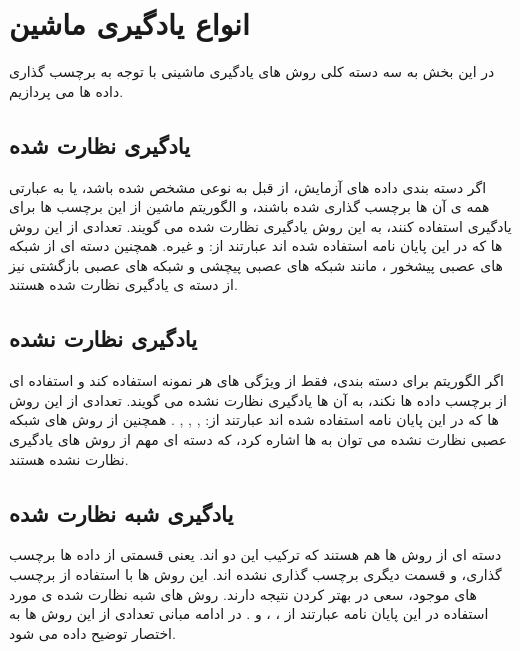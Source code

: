 \section{انواع یادگیری ماشین}

در این بخش به سه دسته کلی روش های یادگیری ماشینی با توجه به برچسب گذاری داده ها می پردازیم.

\subsection{یادگیری نظارت شده}
اگر دسته بندی داده های آزمایش، از قبل به نوعی مشخص شده باشد، یا به عبارتی همه ی آن ها برچسب گذاری شده باشند، و الگوریتم ماشین از این برچسب ها برای یادگیری استفاده کنند، به این روش یادگیری نظارت شده می گویند. تعدادی از این روش ها که در این پایان نامه استفاده شده اند عبارتند از:
و غیره. همچنین دسته ای از شبکه های عصبی پیشخور
،
مانند شبکه های عصبی پیچشی
و
شبکه های عصبی بازگشتی
نیز از دسته ی یادگیری نظارت شده هستند.

\subsection{یادگیری نظارت نشده}
اگر الگوریتم برای دسته بندی، فقط از ویژگی های هر نمونه استفاده کند و استفاده ای از برچسب داده ها نکند، به آن ها یادگیری نظارت نشده می گویند. تعدادی از این روش ها که در این پایان نامه استفاده شده اند عبارتند از:
,
,
,
.
همچنین از روش های شبکه عصبی نظارت نشده می توان به
ها اشاره کرد، که دسته ای مهم از روش های یادگیری نظارت نشده هستند.

\subsection{یادگیری شبه نظارت شده}
دسته ای از روش ها هم هستند که ترکیب این دو اند. یعنی قسمتی از داده ها برچسب گذاری، ‌و قسمت دیگری برچسب گذاری نشده اند.
این روش ها با استفاده از برچسب های موجود، سعی در بهتر کردن نتیجه دارند. روش های شبه نظارت شده ی مورد استفاده در این پایان نامه عبارتند از
،
،
و
.
در ادامه مبانی تعدادی از این روش ها به اختصار توضیح داده می شود.
